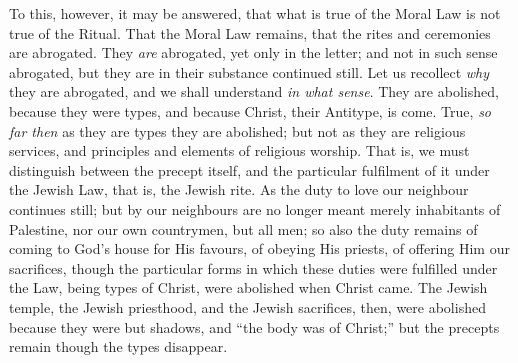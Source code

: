 To this, however, it may be answered, that what is true of the
Moral Law is not true of the Ritual. That the Moral Law remains, that
the rites and ceremonies are abrogated. They \emph{are} abrogated, yet only
in the letter; and not in such sense abrogated, but they are in their
substance continued still. Let us recollect \emph{why} they are
abrogated, and we shall understand \emph{in what sense}. They are
abolished, because they were types, and because Christ, their
Antitype, is come. True, \emph{so far then} as they are types they are
abolished; but not as they are religious services, and principles and
elements of religious worship. That is, we must distinguish between
the precept itself, and the particular fulfilment of it under the
Jewish Law, that is, the Jewish rite. As the duty to love our
neighbour continues still; but by our neighbours are no longer meant
merely inhabitants of Palestine, nor our own countrymen, but all men;
so also the duty remains of coming to God's house for His favours, of
obeying His priests, of offering Him our sacrifices, though the
particular forms in which these duties were fulfilled under the Law,
being types of Christ, were abolished when Christ came. The Jewish
temple, the Jewish priesthood, and the Jewish sacrifices, then, were
abolished because they were but shadows, and ``the body was of
Christ;'' but the precepts remain though the types disappear.


